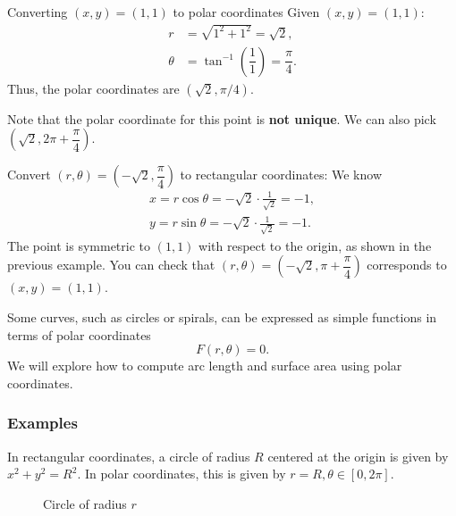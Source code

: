 \begin{ex} Converting $(x,y) = (1, 1)$ to polar coordinates
    Given $(x, y) = (1, 1)$:
    \begin{align*}
        r &= \sqrt{1^2 + 1^2} = \sqrt{2}, \\
        \theta &= \tan^{-1}\left(\dfrac{1}{1}\right) = \dfrac{\pi}{4}.
    \end{align*}
    Thus, the polar coordinates are $(\sqrt{2}, \pi/4)$. 

    Note that the polar coordinate for this point is \textbf{not unique}. We can also pick $(\sqrt{2},2\pi+\dfrac{\pi}{4})$.
\end{ex}
\begin{ex}
    Convert $(r,\theta) = (-\sqrt{2},\dfrac{\pi}{4})$ to rectangular coordinates:
    We know 
    \begin{align*}
        x=r\cos\theta = -\sqrt{2} \cdot \frac{1}{\sqrt{2}} = -1,\\
        y=r\sin\theta = -\sqrt{2} \cdot \frac{1}{\sqrt{2}} = -1.
    \end{align*}
The point is symmetric to $(1,1)$ with respect to the origin, as shown in the previous example. You can check that $(r,\theta) = (-\sqrt{2},\pi+\dfrac{\pi}{4})$ corresponds to $(x,y) = (1,1)$.
\end{ex}

Some curves, such as circles or spirals, can be expressed as simple functions in terms of polar coordinates
\[F(r,\theta) = 0.\]
We will explore how to compute arc length and surface area using polar coordinates.


\subsubsection{Examples}
\begin{ex}
    In rectangular coordinates, a circle of radius $R$ centered at the origin is given by $x^2+y^2 = R^2$. In polar coordinates, this is given by $r = R, \theta \in [0, 2\pi]$.
    \begin{figure}[H]
        \centering
        \resizebox{0.3\textwidth}{!}{} %
        \caption{Circle of radius $r$}
        \label{fig:circle}
    \end{figure}
\end{ex}

